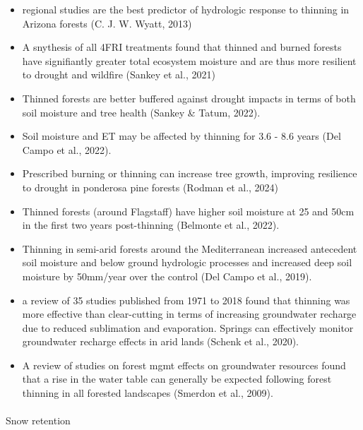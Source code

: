 \documentclass[
]{agujournal2019}
\makeatletter
\let\oldparagraph\paragraph
\renewcommand{\paragraph}{
    \@ifstar
      \xxxParagraphStar
      \xxxParagraphNoStar
  }
\newcommand{\xxxParagraphStar}[1]{\oldparagraph*{#1}\mbox{}}
\newcommand{\xxxParagraphNoStar}[1]{\oldparagraph{#1}\mbox{}}
\makeatother
\begin{document}
\begin{itemize}
\item
  regional studies are the best predictor of hydrologic response to
  thinning in Arizona forests (C. J. W. Wyatt, 2013)
\item
  A snythesis of all 4FRI treatments found that thinned and burned
  forests have signifiantly greater total ecosystem moisture and are
  thus more resilient to drought and wildfire (Sankey et al., 2021)
\item
  Thinned forests are better buffered against drought impacts in terms
  of both soil moisture and tree health (Sankey \& Tatum, 2022).
\item
  Soil moisture and ET may be affected by thinning for 3.6 - 8.6 years
  (Del Campo et al., 2022).
\item
  Prescribed burning or thinning can increase tree growth, improving
  resilience to drought in ponderosa pine forests (Rodman et al., 2024)
\item
  Thinned forests (around Flagstaff) have higher soil moisture at 25 and
  50cm in the first two years post-thinning (Belmonte et al., 2022).
\item
  Thinning in semi-arid forests around the Mediterranean increased
  antecedent soil moisture and below ground hydrologic processes and
  increased deep soil moisture by 50mm/year over the control (Del Campo
  et al., 2019).
\item
  a review of 35 studies published from 1971 to 2018 found that thinning
  was more effective than clear-cutting in terms of increasing
  groundwater recharge due to reduced sublimation and evaporation.
  Springs can effectively monitor groundwater recharge effects in arid
  lands (Schenk et al., 2020).
\item
  A review of studies on forest mgmt effects on groundwater resources
  found that a rise in the water table can generally be expected
  following forest thinning in all forested landscapes (Smerdon et al.,
  2009).
\end{itemize}

\paragraph{Snow retention}\label{snow-retention}
\end{document}
